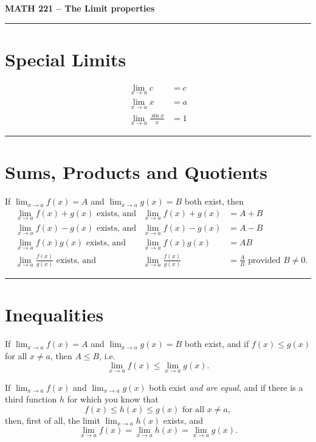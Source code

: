 \documentclass{amsproc}
\begin{document}
\graphicspath{{figures/}}
\centerline{\bfseries MATH 221 -- The Limit properties}

\noindent\rule{\textwidth}{1pt}

\section{Special Limits}
\begin{align}
  \lim_{x\to a} c &= c\\
  \lim_{x\to a} x &= a\\
  \lim_{x\to a} \frac{\sin x}{x} &= 1
\end{align}

\noindent\rule{\textwidth}{1pt}

\section{Sums, Products and Quotients}
If $\lim_{x\to a} f(x) = A$ and $\lim_{x\to a}g(x)=B$ both exist, then
\begin{align}
  &\lim_{x\to a} f(x) +g(x) \text{ exists, and }&\lim_{x\to a} f(x) +g(x) &=A+B \\
  &\lim_{x\to a} f(x) -g(x) \text{ exists, and }&\lim_{x\to a} f(x) -g(x) &=A-B \\
  &\lim_{x\to a} f(x) g(x) \text{ exists, and }&\lim_{x\to a} f(x) g(x) &=AB \\
  &\lim_{x\to a} \frac{f(x) }{g(x)} \text{ exists, and }&\lim_{x\to a} \frac{f(x) }{g(x)}
  &=\frac{A}{B} \text{ provided }B\neq0.
\end{align}

\noindent\rule{\textwidth}{1pt}

\section{Inequalities}
If $\lim_{x\to a} f(x) = A$ and $\lim_{x\to a}g(x)=B$ both exist, and if $f(x)
\leq g(x)$ for all $x\neq a$,  then $A\leq B$, i.e.
\begin{equation}
  \lim_{x\to a} f(x) \leq \lim_{x\to a}g(x).
\end{equation}

If $\lim_{x\to a} f(x) $ and $\lim_{x\to a}g(x)$ both exist \emph{and are
equal}, and if there is a third function $h$ for which you know that
\[
  f(x) \leq h(x) \leq g(x) \text{ for all } x\neq a, 
\]
then, first of all, the limit $\lim_{x\to a} h(x)$ exists, and
\[
  \lim_{x\to a} f(x) = \lim_{x\to a} h(x) = \lim_{x\to a} g(x).
\]
\end{document}
